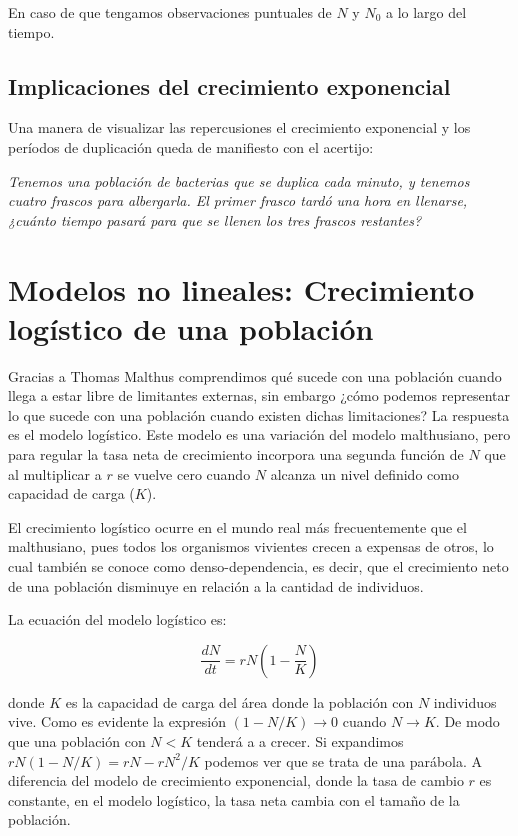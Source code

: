 \documentclass[
]{book}
\begin{document}
En caso de que tengamos observaciones puntuales de \(N\) y \(N_0\) a lo largo del tiempo.

\hypertarget{implicaciones-del-crecimiento-exponencial}{%
\subsection{Implicaciones del crecimiento exponencial}\label{implicaciones-del-crecimiento-exponencial}}

Una manera de visualizar las repercusiones el crecimiento exponencial y los períodos de duplicación queda de manifiesto con el acertijo:

\emph{Tenemos una población de bacterias que se duplica cada minuto, y tenemos cuatro frascos para albergarla. El primer frasco tardó una hora en llenarse, ¿cuánto tiempo pasará para que se llenen los tres frascos restantes?}

\hypertarget{modelos-no-lineales-crecimiento-loguxedstico-de-una-poblaciuxf3n}{%
\section{Modelos no lineales: Crecimiento logístico de una población}\label{modelos-no-lineales-crecimiento-loguxedstico-de-una-poblaciuxf3n}}

Gracias a Thomas Malthus comprendimos qué sucede con una población cuando llega a estar libre de limitantes externas, sin embargo ¿cómo podemos representar lo que sucede con una población cuando existen dichas limitaciones? La respuesta es el modelo logístico. Este modelo es una variación del modelo malthusiano, pero para regular la tasa neta de crecimiento incorpora una segunda función de \(N\) que al multiplicar a \(r\) se vuelve cero cuando \(N\) alcanza un nivel definido como capacidad de carga (\(K\)).

El crecimiento logístico ocurre en el mundo real más frecuentemente que el malthusiano, pues todos los organismos vivientes crecen a expensas de otros, lo cual también se conoce como denso-dependencia, es decir, que el crecimiento neto de una población disminuye en relación a la cantidad de individuos.

La ecuación del modelo logístico es:

\begin{equation}
    \frac{dN}{dt} = rN \left(1 - \frac{N}{K} \right) \label{eq:logis}
\end{equation}

donde \(K\) es la capacidad de carga del área donde la población con \(N\) individuos vive. Como es evidente la expresión \((1-N/K) \rightarrow 0\) cuando \(N \rightarrow K\). De modo que una población con \(N < K\) tenderá a a crecer. Si expandimos \(rN(1 - N/K) = rN-rN^2/K\) podemos ver que se trata de una parábola. A diferencia del modelo de crecimiento exponencial, donde la tasa de cambio \(r\) es constante, en el modelo logístico, la tasa neta cambia con el tamaño de la población.
\end{document}
